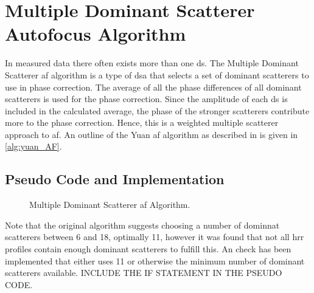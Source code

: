 \documentclass[class=report,11pt,crop=false]{standalone}
\begin{document}
\section{Multiple Dominant Scatterer Autofocus Algorithm}\label{subsec:yuanAF}
In measured data there often exists more than one \gls{ds}. The Multiple Dominant Scatterer \gls{af} algorithm is a type of \gls{dsa} that selects a set of dominant scatterers to use in phase correction. The average of all the phase differences of all dominant scatterers is used for the phase correction. Since the amplitude of each \gls{ds} is included in the calculated average, the phase of the stronger scatterers contribute more to the phase correction. Hence, this is a weighted multiple scatterer approach to \gls{af}.
An outline of the Yuan \gls{af} algorithm as described in \cite{yuan_AF} is given in \autoref{alg:yuan_AF}.

    \subsection{Pseudo Code and Implementation}
    \begin{figure}[h]
      \vspace{0.5cm}
      \centering
      \captionsetup{type=figure}
      \begin{minipage}{.7\linewidth}
        \begin{algorithm}[H]
            \caption{Multiple Dominant Scatterer \gls{af} Algorithm.\label{alg:yuan_AF}}
    
            \DontPrintSemicolon
            \SetAlgoLined
    
    
            \BlankLine
          \vspace{0.5cm}
        \end{algorithm}
      \end{minipage}
    \end{figure}
    Note that the original algorithm suggests choosing a number of dominnat scatterers between 6 and 18, optimally 11, however it was found that not all \gls{hrr} profiles contain enough dominant scatterers to fulfill this. An check has been implemented that either uses 11 or otherwise the minimum number of dominant scatterers available. INCLUDE THE IF STATEMENT IN THE PSEUDO CODE.
\end{document}

